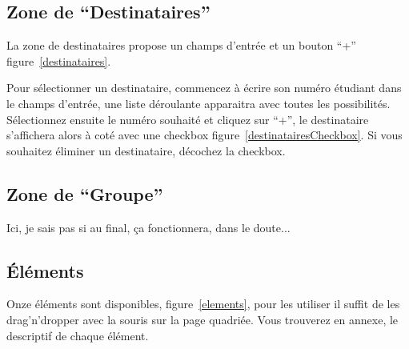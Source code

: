 \documentclass[a4paper,11pt,final]{report}
\begin{document}
\subsection{Zone de ``Destinataires''}
La zone de destinataires propose un champs d'entrée et un bouton ``+'' figure~\ref{destinataires}.

\noindent\begin{minipage}{\linewidth}%
\label{destinataires}
\end{minipage}

Pour sélectionner un destinataire, commencez à écrire son numéro étudiant dans le champs d'entrée, une liste déroulante apparaitra avec toutes les possibilités. Sélectionnez ensuite le numéro souhaité et cliquez sur ``+'', le destinataire s'affichera alors à coté avec une checkbox figure~\ref{destinatairesCheckbox}. Si vous souhaitez éliminer un destinataire, décochez la checkbox.

\noindent\begin{minipage}{\linewidth}%
\label{destinatairesCheckbox}
\end{minipage}


\subsection{Zone de ``Groupe''}
Ici, je sais pas si au final, ça fonctionnera, dans le doute...

\subsection{Éléments}
Onze éléments sont disponibles, figure~\ref{elements}, pour les utiliser il suffit de les drag'n'dropper avec la souris sur la page quadriée. Vous trouverez en annexe, le descriptif de chaque élément.
\end{document}
